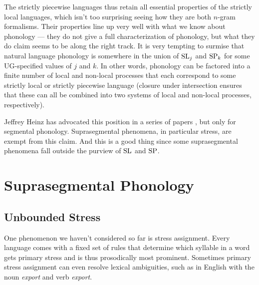 The strictly piecewise languages thus retain all essential properties of the strictly local languages, which isn't too surprising seeing how they are both $n$-gram formalisms.
Their properties line up very well with what we know about phonology --- they do not give a full characterization of phonology, but what they do claim seems to be along the right track.
It is very tempting to surmise that natural language phonology is somewhere in the union of $\mathrm{SL}_j$ and $\mathrm{SP}_k$ for some UG-specified values of $j$ and $k$.
In other words, phonology can be factored into a finite number of local and non-local processes that each correspond to some strictly local or strictly piecewise language (closure under intersection ensures that these can all be combined into two systems of local and non-local processes, respectively).

Jeffrey Heinz has advocated this position in a series of papers \citep{Heinz10,HeinzIdsardi11}, but only for segmental phonology.
Suprasegmental phenomena, in particular stress, are exempt from this claim.
And this is a good thing since some suprasegmental phenomena fall outside the purview of $\mathrm{SL}$ and $\mathrm{SP}$.

\section{Suprasegmental Phonology}

\subsection{Unbounded Stress}
One phenomenon we haven't considered so far is stress assignment.
Every language comes with a fixed set of rules that determine which syllable in a word gets primary stress and is thus prosodically most prominent. 
Sometimes primary stress assignment can even resolve lexical ambiguities, such as in English with the noun \emph{export} and verb \emph{export}.

